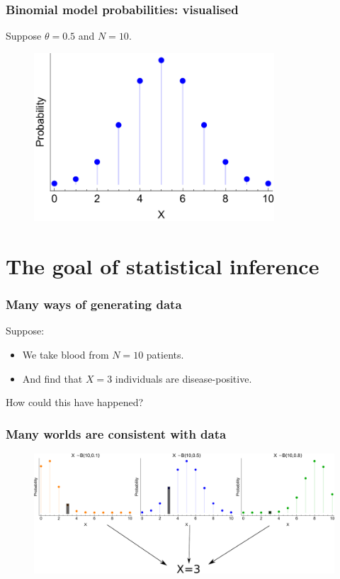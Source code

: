 \documentclass[handout]{beamer}
\begin{document}
\begin{frame}
	\frametitle{Binomial model probabilities: visualised}
	
	Suppose $\theta=0.5$ and $N=10$.
	
	\begin{figure}[h]
		\centerline{\includegraphics[width=0.8\textwidth]{animations_figures/binomial.pdf}}
	\end{figure}
	
\end{frame}

\section{The goal of statistical inference}
\frame{\tableofcontents[currentsection]}


\begin{frame}
	\frametitle{Many ways of generating data}
	
	Suppose:
	
	\begin{itemize}
		\item We take blood from $N=10$ patients.
		\item And find that $X=3$ individuals are disease-positive.
	\end{itemize}
	
	How could this have happened?
	
\end{frame}

\begin{frame}
	\frametitle{Many worlds are consistent with data}
	
	\begin{figure}[h]
		\centerline{\includegraphics[width=1\textwidth]{animations_figures/binomial_many_worlds_inkscaped.pdf}}
	\end{figure}
	
\end{frame}
\end{document}
